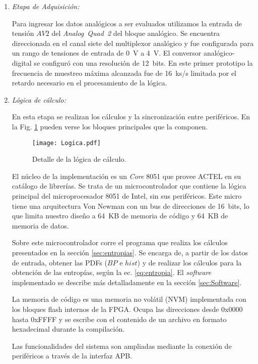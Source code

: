 \begin{enumerate}
	\item \textit{Etapa de Adquisición:}
	
	Para ingresar los datos analógicos a ser evaluados utilizamos la entrada de tensión $AV2$ del \textit{Analog~Quad~2} del bloque analógico.
	Se encuentra direccionada en el canal siete del multiplexor analógico y fue configurada para un rango de tensiones de entrada de 0~V a 4~V.
	El conversor analógico-digital se configuró con una resolución de 12~bits.
	En este primer prototipo la frecuencia de muestreo máxima alcanzada fue de 16~ks/s limitada por el retardo necesario en el procesamiento de la lógica.
	
	\item \textit{Lógica de cálculo:}
	
	En esta etapa se realizan los cálculos y la sincronización entre periféricos.
	En la Fig. \ref{fig:logica} pueden verse los bloques principales que la componen.
	\begin{figure}
		\centering
		\texttt{[image: Logica.pdf]}\\
		\caption{Detalle de la lógica de cálculo.}\label{fig:logica}
	\end{figure}
	
	El núcleo de la implementación es un \textit{Core} 8051 que provee ACTEL en su catálogo de librerías.
	Se trata de un microcontrolador que contiene la lógica principal del microprocesador 8051 de Intel, sin sus periféricos.
	Este micro tiene una arquitectura Von Newman con un bus de direcciones de 16~bits, lo que limita nuestro diseño a 64~KB de memoria de código y 64~KB de memoria de datos.
	
	Sobre este microcontrolador corre el programa que realiza los cálculos presentados en la sección \ref{sec:entropias}.
	Se encarga de, a partir de los datos de entrada, obtener las PDFs ($BP$ e $hist$) y de realizar los cálculos para la obtención de las entropías, según la ec. \ref{eq:entropia}.
	El \textit{software} implementado se describe más detalladamente en la sección \ref{sec:Software}.
	
	La memoria de código es una memoria no volátil (NVM) implementada con los bloques flash internos de la FPGA.
	Ocupa las direcciones desde 0x0000 hasta 0xFFFF y se escribe con el contenido de un archivo en formato hexadecimal durante la compilación.
	
	Las funcionalidades del sistema son ampliadas mediante la conexión de periféricos a través de la interfaz APB.
	

\end{enumerate}
